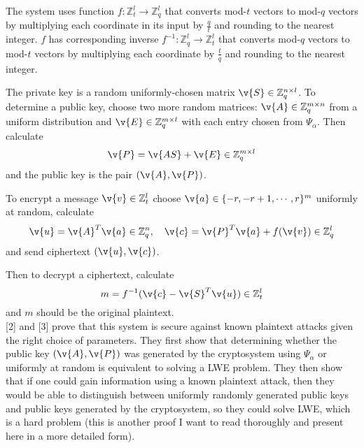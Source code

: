 The system uses function $f: \mathbb{Z}_t^l \to \mathbb{Z}_q^l$ that converts
mod-$t$ vectors to mod-$q$ vectors by multiplying each coordinate in its
input by $\frac{q}{t}$ and rounding to the nearest integer.
$f$ has corresponding inverse $f^{-1}: \mathbb{Z}_q^l \to \mathbb{Z}_t^l$
that converts mod-$q$ vectors to mod-$t$ vectors by multiplying each
coordinate by $\frac{t}{q}$ and rounding to the nearest integer.

The private key is a random uniformly-chosen matrix
$\v{S} \in \mathbb{Z}_q^{n \times l}$. 
To determine a public key, choose two more random matrices:
$\v{A} \in \mathbb{Z}_q^{m \times n}$ from a uniform distribution
and $\v{E} \in \mathbb{Z}_q^{m \times l}$ with each entry chosen
from $\Psi_{\alpha}$. Then calculate 
\begin{equation}
    \v{P} = \v{AS} + \v{E} \in \mathbb{Z}_q^{m \times l} 
\end{equation}
and the public key is the pair $(\v{A}, \v{P})$.

To encrypt a message $\v{v} \in \mathbb{Z}_t^l$ choose $\v{a} \in \{-r, -r+1, \cdots, r\}^m$ uniformly at random, calculate 
\begin{equation}
    \v{u} = \v{A}^T\v{a} \in \mathbb{Z}_q^n,\quad
    \v{c} = \v{P}^T\v{a} + f(\v{v}) \in \mathbb{Z}_q^l
\end{equation}
and send ciphertext $(\v{u}, \v{c})$.

Then to decrypt a ciphertext, calculate 
\begin{equation}
    m = f^{-1}(\v{c} - \v{S}^T\v{u}) \in \mathbb{Z}_t^l
\end{equation}
and $m$ should be the original plaintext.\\

[2] and [3] prove that this system is secure against known plaintext
attacks given the right choice of parameters. They first show that
determining whether the public key $(\v{A}, \v{P})$ was generated
by the cryptosystem using $\Psi_{\alpha}$ or uniformly at random
is equivalent to solving a LWE problem. They then show that if one could
gain information using a known plaintext attack, then they would be able
to distinguish between uniformly randomly generated public keys and
public keys generated by the cryptosystem, so they could solve LWE, 
which is a hard problem (this is another proof I want to read thoroughly
and present here in a more detailed form).

